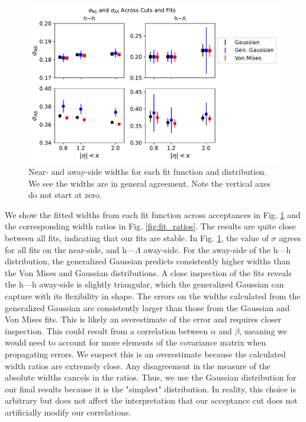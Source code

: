 \documentclass[../main.tex]{subfiles}
\begin{document}
\begin{figure}[h]
    \centering
    \includegraphics[scale=0.7]{results/figs/widths-across-fits.pdf}
    \caption{Near- and away-side widths for each fit function and distribution. We see the widths are in general agreement. Note the vertical axes do not start at zero.}
    \label{fig:fit_widths}
\end{figure}

We show the fitted widths from each fit function across acceptances in Fig. \ref{fig:fit_widths} and the corresponding width ratios in Fig. \ref{fig:fit_ratios}. The results are quite close between all fits, indicating that our fits are stable. In Fig. \ref{fig:fit_widths}, the value of $\sigma$ agrees for all fits on the near-side, and h---$\Lambda$ away-side. For the away-side of the h---h distribution, the generalized Gaussian predicts consistently higher widths than the Von Mises and Gaussian distributions. A close inspection of the fits reveals the h---h away-side is slightly triangular, which the generalized Gaussian can capture with its flexibility in shape. The errors on the widths calculated from the generalized Gaussian are consistently larger than those from the Gaussian and Von Mises fits. This is likely an overestimate of the error and requires closer inspection. This could result from a correlation between $\alpha$ and $\beta$, meaning we would need to account for more elements of the covariance matrix when propagating errors. We suspect this is an overestimate because the calculated width ratios are extremely close. Any disagreement in the measure of the absolute widths cancels in the ratios. Thus, we use the Gaussian distribution for our final results because it is the "simplest" distribution. In reality, this choice is arbitrary but does not affect the interpretation that our acceptance cut does not artificially modify our correlations.  
\end{document}
